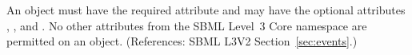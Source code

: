 An \EventAssignment object must have the required attribute
 and may have the optional attributes , ,  and
.  No other attributes from the SBML Level~3 Core namespace
are permitted on an \EventAssignment object.  (References: SBML L3V2
Section~\ref{sec:events}.)
